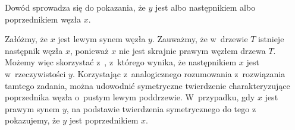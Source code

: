 \exercise %

\noindent Dowód sprowadza się do pokazania, że $y$ jest albo następnikiem albo poprzednikiem węzła $x$.

Załóżmy, że $x$ jest lewym synem węzła $y$.
Zauważmy, że w~drzewie $T$ istnieje następnik węzła $x$, ponieważ $x$ nie jest skrajnie prawym węzłem drzewa $T$.
Możemy więc skorzystać z~, z~którego wynika, że następnikiem $x$ jest w~rzeczywistości $y$.
Korzystając z~analogicznego rozumowania z~rozwiązania tamtego zadania, można udowodnić symetryczne twierdzenie charakteryzujące poprzednika węzła o~pustym lewym poddrzewie.
W~przypadku, gdy $x$ jest prawym synem $y$, na podstawie twierdzenia symetrycznego do tego z~ pokazujemy, że $y$ jest poprzednikiem $x$.
